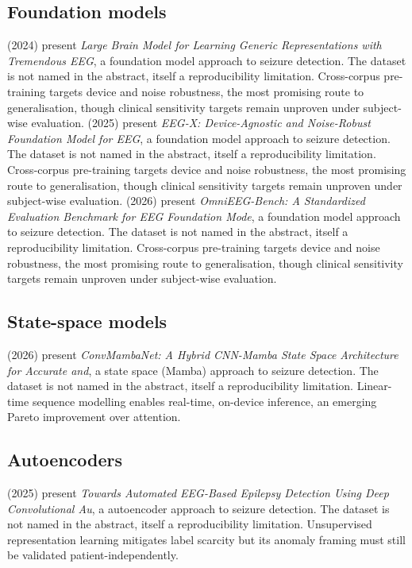 \subsection{Foundation models}
\citet{ep240518765} (2024) present \emph{Large Brain Model for Learning Generic Representations with Tremendous EEG}, a foundation model approach to seizure detection. The dataset is not named in the abstract, itself a reproducibility limitation. Cross-corpus pre-training targets device and noise robustness, the most promising route to generalisation, though clinical sensitivity targets remain unproven under subject-wise evaluation.
\citet{ep251108861} (2025) present \emph{EEG-X: Device-Agnostic and Noise-Robust Foundation Model for EEG}, a foundation model approach to seizure detection. The dataset is not named in the abstract, itself a reproducibility limitation. Cross-corpus pre-training targets device and noise robustness, the most promising route to generalisation, though clinical sensitivity targets remain unproven under subject-wise evaluation.
\citet{ep260600815} (2026) present \emph{OmniEEG-Bench: A Standardized Evaluation Benchmark for EEG Foundation Mode}, a foundation model approach to seizure detection. The dataset is not named in the abstract, itself a reproducibility limitation. Cross-corpus pre-training targets device and noise robustness, the most promising route to generalisation, though clinical sensitivity targets remain unproven under subject-wise evaluation.

\subsection{State-space models}
\citet{ep260113234} (2026) present \emph{ConvMambaNet: A Hybrid CNN-Mamba State Space Architecture for Accurate and}, a state space (Mamba) approach to seizure detection. The dataset is not named in the abstract, itself a reproducibility limitation. Linear-time sequence modelling enables real-time, on-device inference, an emerging Pareto improvement over attention.

\subsection{Autoencoders}
\citet{ep250820535} (2025) present \emph{Towards Automated EEG-Based Epilepsy Detection Using Deep Convolutional Au}, a autoencoder approach to seizure detection. The dataset is not named in the abstract, itself a reproducibility limitation. Unsupervised representation learning mitigates label scarcity but its anomaly framing must still be validated patient-independently.

